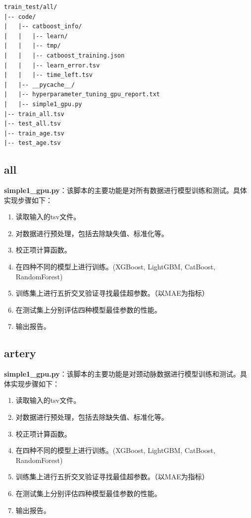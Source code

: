 \documentclass[UTF8]{report}
\theoremstyle{MyLineTheoremStyle} %
\theoremstyle{MyBlockTheoremStyle} %
\theoremstyle{MySubsubsectionStyle} %
\begin{document}
\begin{center}
\begin{verbatim}
train_test/all/
|-- code/
|   |-- catboost_info/
|   |   |-- learn/
|   |   |-- tmp/
|   |   |-- catboost_training.json
|   |   |-- learn_error.tsv
|   |   |-- time_left.tsv
|   |-- __pycache__/
|   |-- hyperparameter_tuning_gpu_report.txt
|   |-- simple1_gpu.py
|-- train_all.tsv
|-- test_all.tsv
|-- train_age.tsv
|-- test_age.tsv
\end{verbatim}
\end{center}

\subsection*{all}

\textbf{simple1\_gpu.py}：该脚本的主要功能是对所有数据进行模型训练和测试。具体实现步骤如下：
\begin{enumerate}
    \item 读取输入的tsv文件。
    \item 对数据进行预处理，包括去除缺失值、标准化等。
    \item 校正项计算函数。
    \item 在四种不同的模型上进行训练。(XGBoost, LightGBM, CatBoost, RandomForest)
    \item 训练集上进行五折交叉验证寻找最佳超参数。（以MAE为指标）
    \item 在测试集上分别评估四种模型最佳参数的性能。
    \item 输出报告。
\end{enumerate}

\subsection*{artery}

\textbf{simple1\_gpu.py}：该脚本的主要功能是对颈动脉数据进行模型训练和测试。具体实现步骤如下：
\begin{enumerate}
    \item 读取输入的tsv文件。
    \item 对数据进行预处理，包括去除缺失值、标准化等。
    \item 校正项计算函数。
    \item 在四种不同的模型上进行训练。(XGBoost, LightGBM, CatBoost, RandomForest)
    \item 训练集上进行五折交叉验证寻找最佳超参数。（以MAE为指标）
    \item 在测试集上分别评估四种模型最佳参数的性能。
    \item 输出报告。
\end{enumerate}
\end{document}
